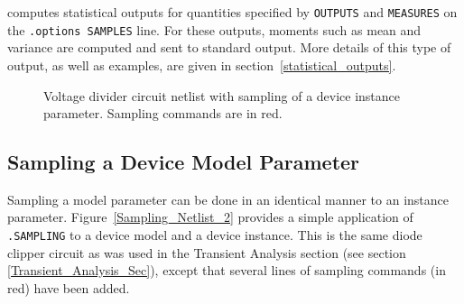 \Xyce{} computes statistical outputs for quantities specified by \texttt{OUTPUTS} 
and \texttt{MEASURES} on the \texttt{.options SAMPLES} line.  For these outputs,
moments such as mean and variance are computed and sent to standard output.  More 
details of this type of output, as well as examples, are given in section~\ref{statistical_outputs}.
\begin{figure}[htbp]
\begin{centering}
\caption{Voltage divider circuit netlist with sampling of a device instance parameter.
Sampling commands are in \color{XyceRed}red\color{black}.
\label{Sampling_Netlist_1}}
\end{centering}
\end{figure}

\subsection{Sampling a Device Model Parameter}
\label{sampling_ModelParam}

Sampling a model parameter can be done in an identical manner to an instance parameter.  
Figure~\ref{Sampling_Netlist_2} provides a simple application of \verb|.SAMPLING| to a 
device model and a device instance.  This is the same diode clipper circuit as was used 
in the Transient Analysis section (see section \ref{Transient_Analysis_Sec}), except that 
several lines of sampling commands (in red) have been added.  

